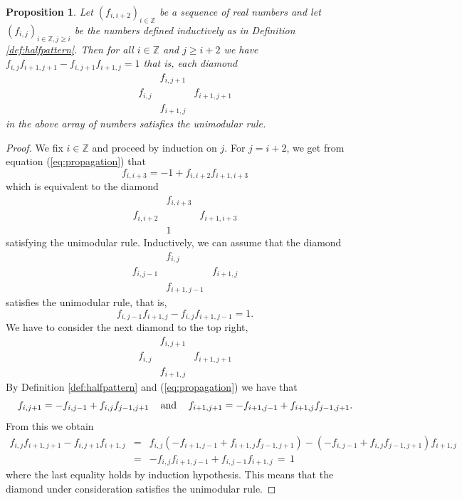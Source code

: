 \documentclass[11pt,a4paper]{amsart}
\newtheorem{Proposition}[Lemma]{Proposition}
\theoremstyle{definition}
\numberwithin{equation}{section}
\begin{document}
\begin{Proposition} \label{prop:unimodular}
Let $(f_{i,i+2})_{i\in \mathbb{Z}}$ be a sequence
of real numbers and let 
$(f_{i,j})_{i\in \mathbb{Z},j\ge i}$ be the 
numbers defined inductively as in Definition 
\ref{def:halfpattern}. Then for all 
$i\in \mathbb{Z}$
and $j\ge i+2$ we have
$f_{i,j}f_{i+1,j+1} - f_{i,j+1}f_{i+1,j}=1
$
that is, each diamond 
$$\begin{array}{ccc}
& f_{i,j+1} & \\ f_{i,j} & & f_{i+1,j+1} \\  
& f_{i+1,j} & 
\end{array}
$$
in the above array of numbers 
satisfies the unimodular rule. 
\end{Proposition}

\begin{proof}
We fix $i\in \mathbb{Z}$ and 
proceed by induction on $j$. For $j=i+2$, we get
from equation (\ref{eq:propagation}) that  
$$f_{i,i+3} = -1 + f_{i,i+2}f_{i+1,i+3}
$$
which is equivalent to the diamond
$$\begin{array}{ccc}
& f_{i,i+3} & \\ f_{i,i+2} & & f_{i+1,i+3} \\  
& 1 & 
\end{array}
$$
satisfying the unimodular rule. Inductively, we can 
assume that the diamond 
$$\begin{array}{ccc}
& f_{i,j} & \\ f_{i,j-1} & & f_{i+1,j} \\  
& f_{i+1,j-1} & 
\end{array}
$$
satisfies the unimodular rule, that is, 
\begin{equation}
 f_{i,j-1}f_{i+1,j}-f_{i,j}f_{i+1,j-1} = 1.
\end{equation}
We have to consider the next diamond to the top right,
$$\begin{array}{ccc}
& f_{i,j+1} & \\ f_{i,j} & & f_{i+1,j+1} \\  
& f_{i+1,j} & 
\end{array}
$$
By Definition \ref{def:halfpattern} and 
(\ref{eq:propagation}) we have that 
$$f_{i,j+1} = -f_{i,j-1}+f_{i,j}f_{j-1,j+1}
\mbox{\,~~~and\,~~~}
f_{i+1,j+1} = -f_{i+1,j-1}+f_{i+1,j}f_{j-1,j+1}.
$$
From this we obtain
\begin{eqnarray*}
f_{i,j}f_{i+1,j+1} - f_{i,j+1}f_{i+1,j}
& = & f_{i,j}(-f_{i+1,j-1}+f_{i+1,j}f_{j-1,j+1})
- (-f_{i,j-1}+f_{i,j}f_{j-1,j+1})f_{i+1,j} \\
& = & -f_{i,j}f_{i+1,j-1} + f_{i,j-1}f_{i+1,j} 
\,=\, 1 
\end{eqnarray*}
where the last equality holds by induction 
hypothesis. This means that the diamond under
consideration satisfies the unimodular rule.
\end{proof}
\end{document}
